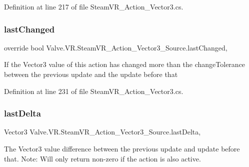 Definition at line 217 of file Steam\+V\+R\+\_\+\+Action\+\_\+\+Vector3.\+cs.

\mbox{\label{class_valve_1_1_v_r_1_1_steam_v_r___action___vector3___source_ad317cbb26225c250e94a5a3cd01265c1}} 
\subsubsection{\texorpdfstring{lastChanged}{lastChanged}}
{\footnotesize\ttfamily override bool Valve.\+V\+R.\+Steam\+V\+R\+\_\+\+Action\+\_\+\+Vector3\+\_\+\+Source.\+last\+Changed\hspace{0.3cm}{\ttfamily [get]}, {}}



If the Vector3 value of this action has changed more than the change\+Tolerance between the previous update and the update before that 



Definition at line 231 of file Steam\+V\+R\+\_\+\+Action\+\_\+\+Vector3.\+cs.

\mbox{\label{class_valve_1_1_v_r_1_1_steam_v_r___action___vector3___source_a481d2d0170d4ad25e13fa4c7898eefbd}} 
\subsubsection{\texorpdfstring{lastDelta}{lastDelta}}
{\footnotesize\ttfamily Vector3 Valve.\+V\+R.\+Steam\+V\+R\+\_\+\+Action\+\_\+\+Vector3\+\_\+\+Source.\+last\+Delta\hspace{0.3cm}{\ttfamily [get]}, {}}



The Vector3 value difference between the previous update and update before that. Note\+: Will only return non-\/zero if the action is also active. 



